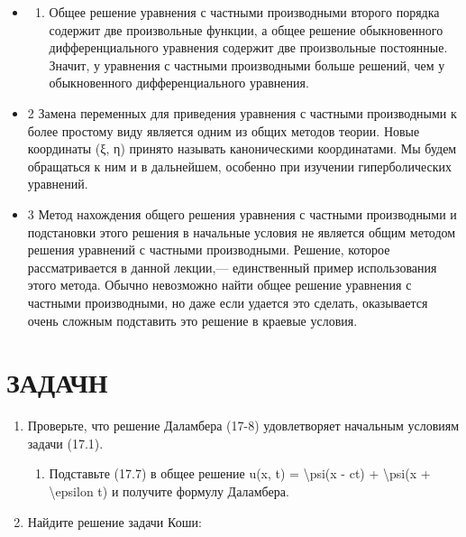 \documentclass[
]{article}
\providecommand{\tightlist}{%
  \setlength{\itemsep}{0pt}\setlength{\parskip}{0pt}}
\begin{document}
\begin{itemize}
\item
  \begin{enumerate}
  \def\labelenumi{\arabic{enumi}.}
  \tightlist
  \item
    Общее решение уравнения с частными производными второго порядка
    содержит две произвольные функции, а общее решение обыкновенного
    дифференциального уравнения содержит две произвольные постоянные.
    Значит, у уравнения с частными производными больше решений, чем у
    обыкновенного дифференциального уравнения.
  \end{enumerate}
\item
  2 Замена переменных для приведения уравнения с частными производными к
  более простому виду является одним из общих методов теории. Новые
  координаты (ξ, η) принято называть каноническими координатами. Мы
  будем обращаться к ним и в дальнейшем, особенно при изучении
  гиперболических уравнений.
\item
  3 Метод нахождения общего решения уравнения с частными производными и
  подстановки этого решения в начальные условия не является общим
  методом решения уравнений с частными производными. Решение, которое
  рассматривается в данной лекции,--- единственный пример использования
  этого метода. Обычно невозможно найти общее решение уравнения с
  частными производными, но даже если удается это сделать, оказывается
  очень сложным подставить это решение в краевые условия.
\end{itemize}

\section{ЗАДАЧН}\label{ux437ux430ux434ux430ux447ux43d}

\begin{enumerate}
\def\labelenumi{\arabic{enumi}.}
\item
  Проверьте, что решение Даламбера (17-8) удовлетворяет начальным
  условиям задачи (17.1).

  \begin{enumerate}
  \def\labelenumii{\arabic{enumii}.}
  \setcounter{enumii}{1}
  \tightlist
  \item
    Подставьте (17.7) в общее решение u(x, t) = \textbackslash psi(x -
    ct) + \textbackslash psi(x + \textbackslash epsilon t) и получите
    формулу Даламбера.
  \end{enumerate}
\item
  Найдите решение задачи Коши:
\end{enumerate}
\end{document}
